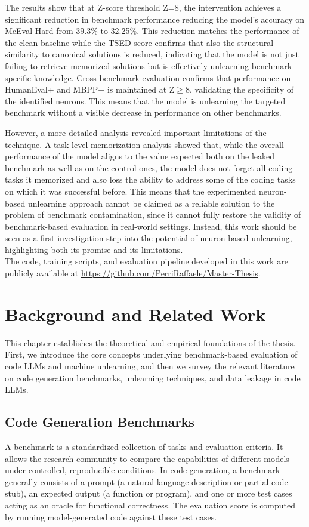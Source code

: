 \documentclass[mscthesis]{usiinfthesis}
\begin{document}
The results show that at Z-score threshold Z=8, the intervention achieves a significant reduction in benchmark performance reducing the model's accuracy on McEval-Hard from 39.3\% to 32.25\%.
This reduction matches the performance of the clean baseline while the TSED score confirms that also the structural similarity to canonical solutions is reduced, indicating that the model is not just failing to retrieve memorized solutions but is effectively unlearning benchmark-specific knowledge.
Cross-benchmark evaluation confirms that performance on HumanEval+ and MBPP+ is maintained at Z$\geq$8, validating the specificity of the identified neurons. This means that the model is unlearning the targeted benchmark without a visible decrease in performance on other benchmarks. 
\par\vspace{1em}
However, a more detailed analysis revealed important limitations of the technique.
A task-level memorization analysis showed that, while the overall performance of the model aligns to the value expected both on the leaked benchmark as well as on the control ones, the model does not forget all coding tasks it memorized and also loss the ability to address some of the coding tasks on which it was successful before.
This means that the experimented neuron-based unlearning approach cannot be claimed as a reliable solution to the problem of benchmark contamination, since it cannot fully restore the validity of benchmark-based evaluation in real-world settings.
Instead, this work should be seen as a first investigation step into the potential of neuron-based unlearning, highlighting both its promise and its limitations.\\
The code, training scripts, and evaluation pipeline developed in this work are publicly available at \url{https://github.com/PerriRaffaele/Master-Thesis}.

\chapter{Background and Related Work}
This chapter establishes the theoretical and empirical foundations of the thesis. \\
First, we introduce the core concepts underlying benchmark-based evaluation of code LLMs and machine unlearning, and then we survey the relevant literature on code generation benchmarks, unlearning techniques, and data leakage in code LLMs.

\section{Code Generation Benchmarks}
A benchmark is a standardized collection of tasks and evaluation criteria. It allows the research community to compare the capabilities of different models under controlled, reproducible conditions. In code generation, a benchmark generally consists of a prompt (a natural-language description or partial code stub), an expected output (a function or program), and one or more test cases acting as an oracle for functional correctness. The evaluation score is computed by running model-generated code against these test cases.\\
\end{document}
